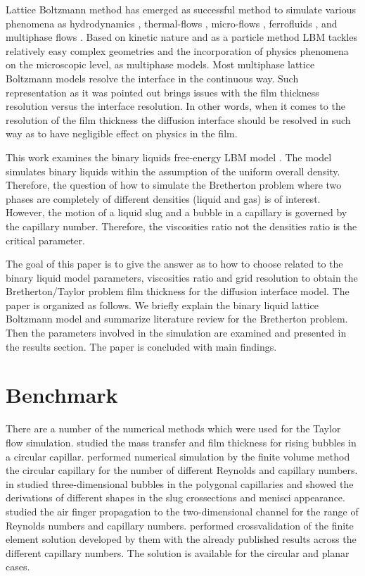 \documentclass{article}
\begin{document}
Lattice Boltzmann method has emerged as successful method to simulate various
phenomena as hydrodynamics \cite{yu}, thermal-flows
\cite{karlin-minimalmodels}, micro-flows \cite{ansumali-small-knudsen},
ferrofluids \cite{kuzmin-aniso}, and multiphase flows
\cite{swift,Shan-chen:extended}. Based on kinetic nature and as a particle
method LBM tackles relatively easy complex geometries and the incorporation of
physics phenomena on the microscopic level, as multiphase models. Most
multiphase lattice Boltzmann models \cite{swift, Shan-chen:extended} resolve
the interface in the continuous way. Such representation as it was pointed out
brings issues with the film thickness resolution versus the interface
resolution. In other words, when it comes to the resolution of the film
thickness the diffusion interface should be resolved in such way as to have
negligible effect on physics in the film. 

This work examines the binary liquids free-energy LBM model \cite{swift}. The
model simulates binary liquids within the assumption of the uniform overall
density. Therefore, the question of how to simulate the Bretherton problem
where two phases are completely of different densities (liquid and gas) is of
interest. However, the motion of a liquid slug and a bubble in a capillary is
governed by the capillary number. Therefore, the viscosities ratio not the
densities ratio is the critical parameter. 

The goal of this paper is to give the answer as to how to choose related to the
binary liquid model parameters, viscosities ratio and grid
resolution to obtain the Bretherton/Taylor problem film thickness for the
diffusion interface model. The paper is organized as follows. We briefly
explain the binary liquid lattice Boltzmann model and summarize literature
review for the Bretherton problem. Then the parameters involved in the
simulation are examined and presented in the results section. The paper is
concluded with main findings.

\section{Benchmark}

There are a number of the numerical methods which were used for the Taylor flow
simulation. \citet{vanbaten-circular} studied the mass transfer and film
thickness for rising bubbles in a circular capillar.
\citet{kreutzer-pressure-drop} performed numerical simulation by the
finite volume method the circular capillary for the number of different
Reynolds and capillary numbers. \citeauthor{wong-films} in
\cite{wong-films,wong-pressure} studied three-dimensional bubbles in the
polygonal capillaries and showed the derivations of different shapes in the
slug crossections and menisci appearance.
\citet{heil-bretherton,ingham-plates} studied the air finger propagation to
the two-dimensional channel for the range of Reynolds numbers and capillary
numbers. \citet{giavedoni-numerical} performed crossvalidation of the
finite element solution developed by them with the already published results
across the different capillary numbers. The solution is available for the
circular and planar cases. 
\end{document}
